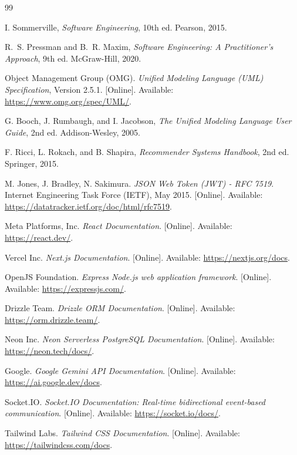 \cleardoublepage
{}
{}
\begin{thebibliography}{99}


I. Sommerville, \textit{Software Engineering}, 10th ed. Pearson, 2015.

R.~S. Pressman and B.~R. Maxim, \textit{Software Engineering: A Practitioner's Approach}, 9th ed. McGraw-Hill, 2020.

Object Management Group (OMG). \textit{Unified Modeling Language (UML) Specification}, Version 2.5.1. [Online]. Available: \url{https://www.omg.org/spec/UML/}.

G. Booch, J. Rumbaugh, and I. Jacobson, \textit{The Unified Modeling Language User Guide}, 2nd ed. Addison-Wesley, 2005.

F. Ricci, L. Rokach, and B. Shapira, \textit{Recommender Systems Handbook}, 2nd ed. Springer, 2015.


M. Jones, J. Bradley, N. Sakimura. \textit{JSON Web Token (JWT) - RFC 7519}. Internet Engineering Task Force (IETF), May 2015. [Online]. Available: \url{https://datatracker.ietf.org/doc/html/rfc7519}.


Meta Platforms, Inc. \textit{React Documentation}. [Online]. Available: \url{https://react.dev/}.

Vercel Inc. \textit{Next.js Documentation}. [Online]. Available: \url{https://nextjs.org/docs}.

OpenJS Foundation. \textit{Express Node.js web application framework}. [Online]. Available: \url{https://expressjs.com/}.

Drizzle Team. \textit{Drizzle ORM Documentation}. [Online]. Available: \url{https://orm.drizzle.team/}.

Neon Inc. \textit{Neon Serverless PostgreSQL Documentation}. [Online]. Available: \url{https://neon.tech/docs/}.

Google. \textit{Google Gemini API Documentation}. [Online]. Available: \url{https://ai.google.dev/docs}.

Socket.IO. \textit{Socket.IO Documentation: Real-time bidirectional event-based communication}. [Online]. Available: \url{https://socket.io/docs/}.

Tailwind Labs. \textit{Tailwind CSS Documentation}. [Online]. Available: \url{https://tailwindcss.com/docs}.

\end{thebibliography}
